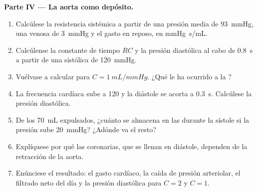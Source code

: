 \begin{problem}
\medskip
\noindent\textbf{Parte IV --- La aorta como depósito.}
\begin{enumerate}[resume]
  \item Calcúlese la resistencia sistémica a partir de una presión media de
        \qty{93}{mmHg}, una venosa de \qty{3}{mmHg} y el gasto en reposo,
        en \unit{mmHg.s/mL}.
  \item Calcúlense la constante de tiempo $RC$ y la presión diastólica al
        cabo de \qty{0.8}{s} a partir de una sistólica de \qty{120}{mmHg}.
  \item Vuélvase a calcular para $C = \qty{1}{mL/mmHg}$. ¿Qué le ha
        ocurrido a la ?
  \item La frecuencia cardíaca sube a \num{120} y la diástole se acorta a
        \qty{0.3}{s}. Calcúlese la presión diastólica.
  \item De los \qty{70}{mL} expulsados, ¿cuánto se almacena en las 
        durante la sístole si la presión sube \qty{20}{mmHg}? ¿Adónde va el
        resto?
  \item Explíquese por qué las  coronarias, que se llenan en
        diástole, dependen de la retracción de la aorta.
  \item Enúnciese el resultado: el gasto cardíaco, la caída de presión
        arteriolar, el filtrado neto del día y la presión diastólica para
        $C = 2$ y $C = 1$.
\end{enumerate}
\end{problem}
